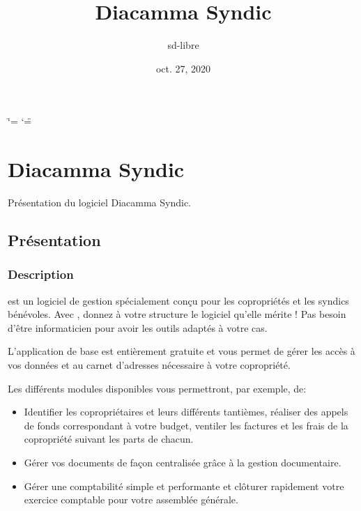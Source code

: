 \documentclass[a4paper,10pt,oneside,french]{sphinxmanual}
\title{Diacamma Syndic}
\date{oct. 27, 2020}
\author{sd-libre}
\begin{document}
\ifdefined\shorthandoff
  \ifnum\catcode`\=\string=\active\shorthandoff{=}\fi
  \ifnum\catcode`\"=\active{}\fi
\fi

\pagestyle{empty}
\sphinxmaketitle
\pagestyle{plain}
\sphinxtableofcontents
\pagestyle{normal}
\label{\detokenize{index::doc}}



\chapter{Diacamma Syndic}
\label{\detokenize{syndic/index:diacamma-syndic}}\label{\detokenize{syndic/index::doc}}
Présentation du logiciel Diacamma Syndic.


\section{Présentation}
\label{\detokenize{syndic/presentation:presentation}}\label{\detokenize{syndic/presentation::doc}}

\subsection{Description}
\label{\detokenize{syndic/presentation:description}}
 est un logiciel de gestion spécialement conçu pour les copropriétés et les syndics bénévoles.
Avec , donnez à votre structure le logiciel qu’elle mérite ! Pas besoin d’être informaticien pour avoir les outils adaptés à votre cas.

L’application de base est entièrement gratuite et vous permet de gérer les accès à vos données et au carnet d’adresses nécessaire à votre copropriété.

Les différents modules disponibles vous permettront, par exemple, de:
\begin{itemize}
\item {} 
Identifier les copropriétaires et leurs différents tantièmes, réaliser des appels de fonds correspondant à votre budget, ventiler les factures et les frais de la copropriété suivant les parts de chacun.

\item {} 
Gérer vos documents de façon centralisée grâce à la gestion documentaire.

\item {} 
Gérer une comptabilité simple et performante et clôturer rapidement votre exercice comptable pour votre assemblée générale.

\end{itemize}
\end{document}
